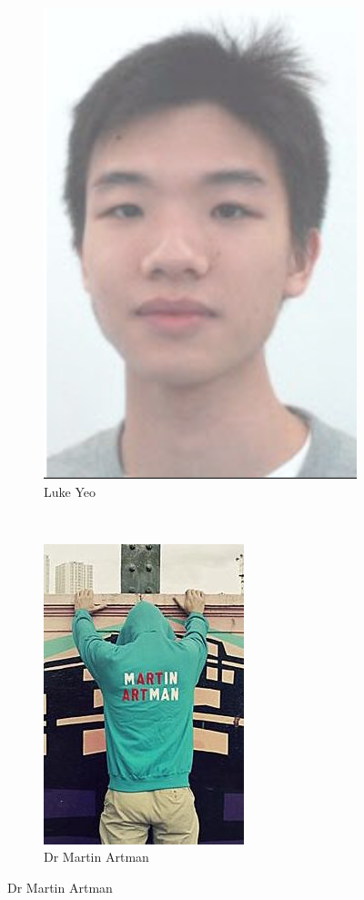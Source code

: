 \begin{figure}
\begin{subfigure}[b]{0.45\textwidth}
        \includegraphics[height=0.3\textheight]{Files/LY}
        \caption{Luke Yeo}
    \end{subfigure}\\
    \vspace{0.5cm}
    \begin{subfigure}[b]{\textwidth}
        \centering
        \includegraphics[height=0.3\textheight]{Files/MF}
        \caption{Dr Martin Artman}
    \end{subfigure}
\end{figure}
